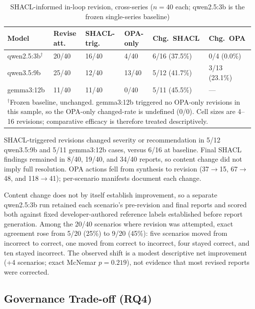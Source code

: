 \documentclass[journal,twoside,web]{ieeecolor}
\begin{document}
\begin{table}[t]
\centering
\caption{SHACL-informed in-loop revision, cross-series ($n=40$ each; qwen2.5:3b is the frozen single-series baseline)}
\label{tab:inloop-cross-series}
\scriptsize
\setlength{\tabcolsep}{2.0pt}
\begin{tabular}{lp{}p{}p{}p{}p{}}
\hline
\textbf{Model} & \textbf{Revise att.} & \textbf{SHACL-trig.} & \textbf{OPA-only} & \textbf{Chg.\ SHACL} & \textbf{Chg.\ OPA} \\
\hline
qwen2.5:3b$^\dagger$ & 20/40 & 16/40 & 4/40 & 6/16 (37.5\%) & 0/4 (0.0\%) \\
qwen3.5:9b & 25/40 & 12/40 & 13/40 & 5/12 (41.7\%) & 3/13 (23.1\%) \\
gemma3:12b & 11/40 & 11/40 & 0/40 & 5/11 (45.5\%) & --- \\
\hline
\multicolumn{6}{p{0.94\columnwidth}}{\scriptsize $^\dagger$Frozen baseline, unchanged. gemma3:12b triggered no OPA-only revisions in this sample, so the OPA-only changed-rate is undefined (0/0). Cell sizes are 4--16 revisions; comparative efficacy is therefore treated descriptively.} \\
\end{tabular}
\end{table}

SHACL-triggered revisions changed severity or recommendation in 5/12 qwen3.5:9b and 5/11 gemma3:12b cases, versus 6/16 at baseline. Final SHACL findings remained in 8/40, 19/40, and 34/40 reports, so content change did not imply full resolution. OPA actions fell from synthesis to revision (37$\to$15, 67$\to$48, and 118$\to$41); per-scenario manifests document each change.

Content change does not by itself establish improvement, so a separate qwen2.5:3b run retained each scenario's pre-revision and final reports and scored both against fixed developer-authored reference labels established before report generation. Among the 20/40 scenarios where revision was attempted, exact agreement rose from 5/20 (25\%) to 9/20 (45\%): five scenarios moved from incorrect to correct, one moved from correct to incorrect, four stayed correct, and ten stayed incorrect. The observed shift is a modest descriptive net improvement (+4 scenarios; exact McNemar $p=0.219$), not evidence that most revised reports were corrected.

\subsection{Governance Trade-off (RQ4)}
\label{sec:rq4-tradeoff}
\end{document}
